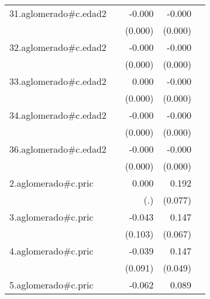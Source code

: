 {\begin{longtable}{l*{4}{D{.}{.}{-1}}}
\addlinespace
31.aglomerado#c.edad2&                     &      -0.000         &      -0.000\sym{***}&                     \\
            &                     &     (0.000)         &     (0.000)         &                     \\
\addlinespace
32.aglomerado#c.edad2&                     &      -0.000         &      -0.000\sym{***}&                     \\
            &                     &     (0.000)         &     (0.000)         &                     \\
\addlinespace
33.aglomerado#c.edad2&                     &       0.000         &      -0.000\sym{***}&                     \\
            &                     &     (0.000)         &     (0.000)         &                     \\
\addlinespace
34.aglomerado#c.edad2&                     &      -0.000         &      -0.000\sym{***}&                     \\
            &                     &     (0.000)         &     (0.000)         &                     \\
\addlinespace
36.aglomerado#c.edad2&                     &      -0.000         &      -0.000\sym{***}&                     \\
            &                     &     (0.000)         &     (0.000)         &                     \\
\addlinespace
2.aglomerado#c.pric&                     &       0.000         &       0.192\sym{*}  &                     \\
            &                     &         (.)         &     (0.077)         &                     \\
\addlinespace
3.aglomerado#c.pric&                     &      -0.043         &       0.147\sym{*}  &                     \\
            &                     &     (0.103)         &     (0.067)         &                     \\
\addlinespace
4.aglomerado#c.pric&                     &      -0.039         &       0.147\sym{**} &                     \\
            &                     &     (0.091)         &     (0.049)         &                     \\
\addlinespace
5.aglomerado#c.pric&                     &      -0.062         &       0.089         &                     \\

\end{longtable}}
